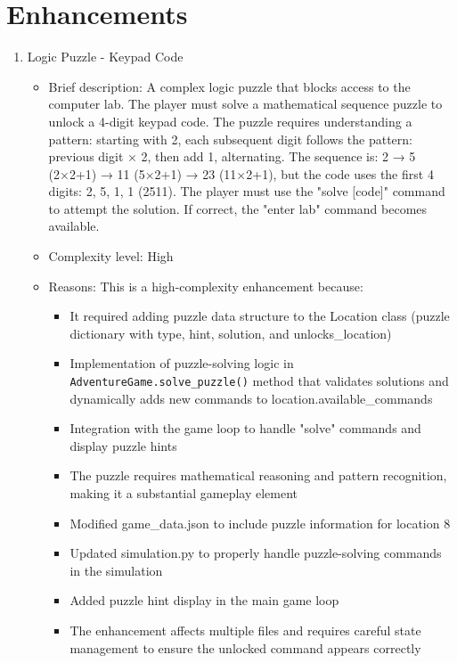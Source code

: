 \documentclass[11pt]{article}
\begin{document}
\section*{Enhancements}
\begin{enumerate}
    \item Logic Puzzle - Keypad Code
    \begin{itemize}
        \item Brief description: A complex logic puzzle that blocks access to the computer lab. The player must solve a mathematical sequence puzzle to unlock a 4-digit keypad code. The puzzle requires understanding a pattern: starting with 2, each subsequent digit follows the pattern: previous digit × 2, then add 1, alternating. The sequence is: 2 → 5 (2×2+1) → 11 (5×2+1) → 23 (11×2+1), but the code uses the first 4 digits: 2, 5, 1, 1 (2511). The player must use the "solve [code]" command to attempt the solution. If correct, the "enter lab" command becomes available.
        
        \item Complexity level: High
        
        \item Reasons: This is a high-complexity enhancement because:
        \begin{itemize}
            \item It required adding puzzle data structure to the Location class (puzzle dictionary with type, hint, solution, and unlocks\_location)
            \item Implementation of puzzle-solving logic in \texttt{AdventureGame.solve\_puzzle()} method that validates solutions and dynamically adds new commands to location.available\_commands
            \item Integration with the game loop to handle "solve" commands and display puzzle hints
            \item The puzzle requires mathematical reasoning and pattern recognition, making it a substantial gameplay element
            \item Modified game\_data.json to include puzzle information for location 8
            \item Updated simulation.py to properly handle puzzle-solving commands in the simulation
            \item Added puzzle hint display in the main game loop
            \item The enhancement affects multiple files and requires careful state management to ensure the unlocked command appears correctly
        \end{itemize}
        

\end{itemize}
\end{enumerate}
\end{document}
